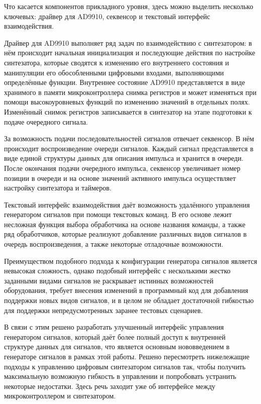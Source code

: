 \documentclass{report}
\begin{document}
Что касается компонентов прикладного уровня, здесь можно выделить несколько ключевых: драйвер для AD9910, секвенсор и текстовый интерфейс взаимодействия.

Драйвер для AD9910 выполняет ряд задач по взаимодействию с синтезатором: в нём происходит начальная инициализация и последующие действия по настройке синтезатора, которые сводятся к изменению его внутреннего состояния и манипуляции его обособленными цифровыми входами, выполняющими определённые функции. Внутреннее состояние AD9910 представляется в виде хранимого в памяти микроконтроллера снимка регистров и может изменяться при помощи высокоуровневых функций по изменению значений в отдельных полях. Изменённый снимок регистров записывается в синтезатор на этапе подготовки к подаче очередного сигнала.

За возможность подачи последовательностей сигналов отвечает секвенсор. В нём происходит воспроизведение очереди сигналов. Каждый сигнал представляется в виде единой структуры данных для описания импульса и хранится в очереди. После окончания подачи очередного импульса, секвенсор увеличивает номер позиции в очереди и на основе значений активного импульса осуществляет настройку синтезатора и таймеров.

Текстовый интерфейс взаимодействия даёт возможность удалённого управления генератором сигналов при помощи текстовых команд. В его основе лежит несложная функция выбора обработчика на основе названия команды, а также ряд обработчиков, которые реализуют добавление различных видов сигналов в очередь воспроизведения, а также некоторые отладочные возможности.

Преимуществом подобного подхода к конфигурации генератора сигналов является невысокая сложность, однако подобный интерфейс с несколькими жестко заданными видами сигналов не раскрывает истинных возможностей оборудования, требует внесения изменений в программный код для добавления поддержки новых видов сигналов, и в целом не обладает достаточной гибкостью для поддержки непредусмотренных заранее тестовых сценариев.

В связи с этим решено разработать улучшенный интерфейс управления генератором сигналов, который даёт более полный доступ к внутренней структуре данных для сигналов, что является основным нововведением в генераторе сигналов в рамках этой работы. Решено пересмотреть нижележащие подходы к управлению цифровым синтезатором сигналов так, чтобы получить максимальную возможную гибкость в управлении и попробовать устранить некоторые недостатки. Здесь речь заходит уже об интерфейсе между микроконтроллером и синтезатором.
\end{document}
